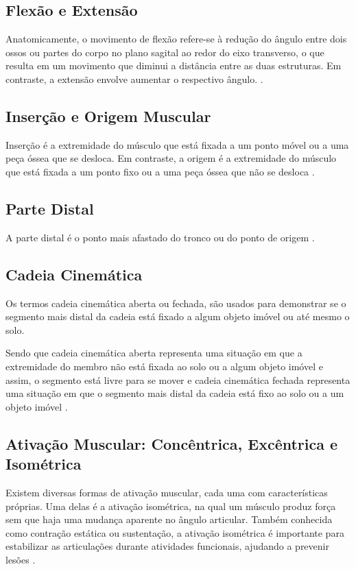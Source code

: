 \subsection[Flexão e Extensão]{Flexão e Extensão}
Anatomicamente, o movimento de flexão refere-se à redução do ângulo entre dois ossos ou partes do corpo no plano sagital ao redor do eixo transverso, o que resulta em um movimento que diminui a distância entre as duas estruturas. Em contraste, a extensão envolve aumentar o respectivo ângulo. \cite{flexao}.


\subsection[Inserção e Origem Muscular]{Inserção e Origem Muscular}
Inserção é a extremidade do músculo que está fixada a um ponto móvel ou a uma peça óssea que se desloca. Em contraste, a origem é a extremidade do músculo que está fixada a um ponto fixo ou a uma peça óssea que não se desloca \cite{sisMuscular}.


\subsection[Parte Distal]{Parte Distal}
A parte distal é o ponto mais afastado do tronco ou do ponto de origem \cite{distal}.



\subsection[Cadeia Cinemática]{Cadeia Cinemática}
Os termos cadeia cinemática aberta ou fechada, são usados para demonstrar se o segmento mais distal da cadeia está fixado a algum objeto imóvel ou até mesmo o solo.

Sendo que cadeia cinemática aberta representa uma situação em que a extremidade do membro não está fixada ao solo ou a algum objeto imóvel e assim, o segmento está livre para se mover e cadeia cinemática fechada representa uma situação em que o segmento mais distal da cadeia está fixo ao solo ou a um objeto imóvel \cite{silva2015cinesiologia}.


\subsection[Ativação Muscular]{Ativação Muscular: Concêntrica, Excêntrica e Isométrica}

Existem diversas formas de ativação muscular, cada uma com características próprias. Uma delas é a ativação isométrica, na qual um músculo produz força sem que haja uma mudança aparente no ângulo articular. Também conhecida como contração estática ou sustentação, a ativação isométrica é importante para estabilizar as articulações durante atividades funcionais, ajudando a prevenir lesões \cite{cinesiologia}.

